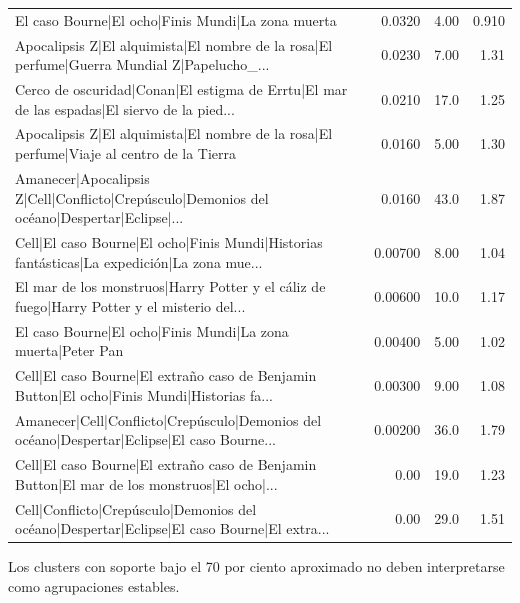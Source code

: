 \begin{table}[htbp]
\begin{tabular}{lrrr}
El caso Bourne|El ocho|Finis Mundi|La zona muerta & 0.0320 & 4.00 & 0.910 \\
Apocalipsis Z|El alquimista|El nombre de la rosa|El perfume|Guerra Mundial Z|Papelucho\_... & 0.0230 & 7.00 & 1.31 \\
Cerco de oscuridad|Conan|El estigma de Errtu|El mar de las espadas|El siervo de la pied... & 0.0210 & 17.0 & 1.25 \\
Apocalipsis Z|El alquimista|El nombre de la rosa|El perfume|Viaje al centro de la Tierra & 0.0160 & 5.00 & 1.30 \\
Amanecer|Apocalipsis Z|Cell|Conflicto|Crepúsculo|Demonios del océano|Despertar|Eclipse|... & 0.0160 & 43.0 & 1.87 \\
Cell|El caso Bourne|El ocho|Finis Mundi|Historias fantásticas|La expedición|La zona mue... & 0.00700 & 8.00 & 1.04 \\
El mar de los monstruos|Harry Potter y el cáliz de fuego|Harry Potter y el misterio del... & 0.00600 & 10.0 & 1.17 \\
El caso Bourne|El ocho|Finis Mundi|La zona muerta|Peter Pan & 0.00400 & 5.00 & 1.02 \\
Cell|El caso Bourne|El extraño caso de Benjamin Button|El ocho|Finis Mundi|Historias fa... & 0.00300 & 9.00 & 1.08 \\
Amanecer|Cell|Conflicto|Crepúsculo|Demonios del océano|Despertar|Eclipse|El caso Bourne... & 0.00200 & 36.0 & 1.79 \\
Cell|El caso Bourne|El extraño caso de Benjamin Button|El mar de los monstruos|El ocho|... & 0.00 & 19.0 & 1.23 \\
Cell|Conflicto|Crepúsculo|Demonios del océano|Despertar|Eclipse|El caso Bourne|El extra... & 0.00 & 29.0 & 1.51 \\
\bottomrule
\end{tabular}
\vspace{0.5em}
\begin{minipage}{\linewidth}\footnotesize Los clusters con soporte bajo el 70 por ciento aproximado no deben interpretarse como agrupaciones estables.\end{minipage}
\end{table}

